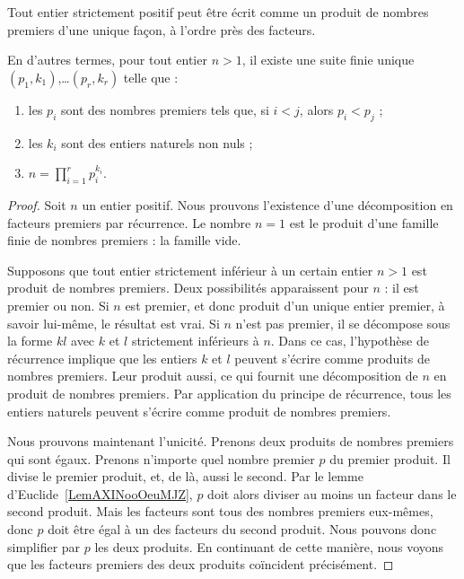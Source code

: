 \begin{theorem}        \label{ThoAJFJooAveRvY}
    Tout entier strictement positif peut être écrit comme un produit de nombres premiers d'une unique façon, à l'ordre près des facteurs.

    En d'autres termes, pour tout entier \( n>1\), il existe une suite finie unique $(p_1, k_1)$,\ldots $(p_r, k_r)$ telle que :
    \begin{enumerate}
        \item
    les \( p_i\) sont des nombres premiers tels que, si $i < j$, alors $p_i < p_j$ ;
    \item
    les \( k_i\) sont des entiers naturels non nuls ;
    \item
        \( n=\prod_{i=1}^rp_i^{k_i}\).
    \end{enumerate}
\end{theorem}

\begin{proof}
    Soit \( n\) un entier positif. Nous prouvons l'existence d'une décomposition en facteurs premiers par récurrence. Le nombre \( n=1\) est le produit d'une famille finie de nombres premiers : la famille vide.

    Supposons que tout entier strictement inférieur à un certain entier \( n>1\) est produit de nombres premiers. Deux possibilités apparaissent pour $n$ : il est premier ou non. Si $n$ est premier, et donc produit d'un unique entier premier, à savoir lui-même, le résultat est vrai. Si \( n\) n'est pas premier, il se décompose sous la forme $kl$ avec $k$ et $l$ strictement inférieurs à $n$. Dans ce cas, l'hypothèse de récurrence implique que les entiers $k$ et $l$ peuvent s'écrire comme produits de nombres premiers. Leur produit aussi, ce qui fournit une décomposition de $n$ en produit de nombres premiers.  Par application du principe de récurrence, tous les entiers naturels peuvent s'écrire comme produit de nombres premiers.

    Nous prouvons maintenant l'unicité. Prenons deux produits de nombres premiers qui sont égaux. Prenons n'importe quel nombre premier $p$ du premier produit. Il divise le premier produit, et, de là, aussi le second. Par le lemme d'Euclide~\ref{LemAXINooOeuMJZ}, $p$ doit alors diviser au moins un facteur dans le second produit. Mais les facteurs sont tous des nombres premiers eux-mêmes, donc $p$ doit être égal à un des facteurs du second produit. Nous pouvons donc simplifier par $p$ les deux produits. En continuant de cette manière, nous voyons que les facteurs premiers des deux produits coïncident précisément.
\end{proof}

